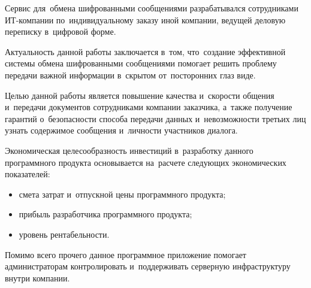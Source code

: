 Сервис для~обмена шифрованными сообщениями разрабатывался сотрудниками ИТ-компании по~индивидуальному заказу иной компании, ведущей деловую переписку в~цифровой форме.

Актуальность данной работы заключается в~том, что~создание эффективной системы обмена шифрованными сообщениями помогает решить проблему передачи важной информации в~скрытом от~посторонних глаз виде.

Целью данной работы является повышение качества и~скорости общения и~передачи документов сотрудниками компании заказчика, а~также получение гарантий о~безопасности способа передачи данных и~невозможности третьих лиц узнать содержимое сообщения и~личности участников диалога.

Экономическая целесообразность инвестиций в~разработку данного программного продукта основывается на~расчете следующих экономических показателей:
\begin{itemize}
    \item смета затрат и~отпускной цены программного продукта;
    \item прибыль разработчика программного продукта;
    \item уровень рентабельности.
\end{itemize}

Помимо всего прочего данное программное приложение помогает администраторам контролировать и~поддерживать серверную инфраструктуру внутри компании.